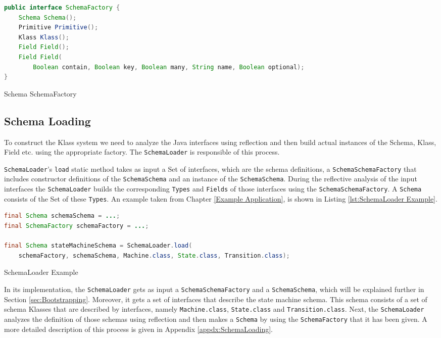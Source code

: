 \begin{sourcecode} [H]
	\begin{lstlisting}[language=Java, escapechar=|]
public interface SchemaFactory {
    Schema Schema();
    Primitive Primitive();
    Klass Klass();
    Field Field();
    Field Field(
    	Boolean contain, Boolean key, Boolean many, String name, Boolean optional);
}
	\end{lstlisting}
	\caption{Schema SchemaFactory}
	\label{lst:SchemaSchemaFactory}
\end{sourcecode}

\subsection{Schema Loading}\label{sec:Schema Loading}
To construct the Klass system we need to analyze the Java interfaces using reflection and then build actual instances of the Schema, Klass, Field etc. using the appropriate factory.
The \texttt{SchemaLoader} is responsible of this process.

\texttt{SchemaLoader}'s \texttt{load} static method takes as input a Set of interfaces, which are the schema definitions, a \texttt{SchemaSchemaFactory} that includes constructor definitions of the \texttt{SchemaSchema} and an instance of the \texttt{SchemaSchema}.
During the reflective analysis of the input interfaces the \texttt{SchemaLoader} builds the corresponding \texttt{Types} and \texttt{Fields} of those interfaces using the \texttt{SchemaSchemaFactory}.
A \texttt{Schema} consists of the Set of these \texttt{Types}.
An example taken from Chapter \ref{Example Application}, is shown in Listing \ref{lst:SchemaLoader Example}.

\begin{sourcecode} [H]
	\begin{lstlisting}[language=Java, escapechar=|]
final Schema schemaSchema = ...;
final SchemaFactory schemaFactory = ...;

final Schema stateMachineSchema = SchemaLoader.load(
	schemaFactory, schemaSchema, Machine.class, State.class, Transition.class);
	\end{lstlisting}
	\caption{SchemaLoader Example}
	\label{lst:SchemaLoader Example}
\end{sourcecode}

In its implementation, the \texttt{SchemaLoader} gets as input a \texttt{SchemaSchemaFactory} and a \texttt{SchemaSchema}, which will be explained further in Section \ref{sec:Bootstrapping}.
Moreover, it gets a set of interfaces that describe the state machine schema.
This schema consists of a set of schema Klasses that are described by interfaces, namely \texttt{Machine.class}, \texttt{State.class} and \texttt{Transition.class}.
Next, the \texttt{SchemaLoader} analyzes the definition of those schemas using reflection and then makes a \texttt{Schema} by using the \texttt{SchemaFactory} that it has been given.
A more detailed description of this process is given in Appendix \ref{appdx:SchemaLoading}.

